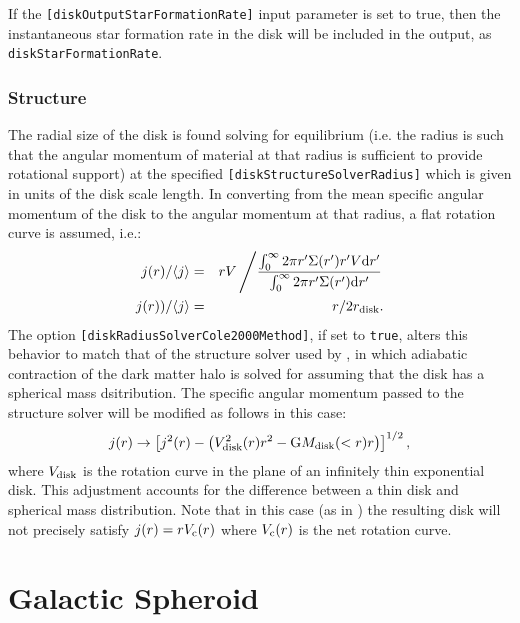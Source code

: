 If the {\tt [diskOutputStarFormationRate]} input parameter is set to true, then the instantaneous star formation rate in the disk will be included in the output, as {\tt diskStarFormationRate}.

\subsubsection{Structure}

The radial size of the disk is found solving for equilibrium (i.e. the radius is such that the angular momentum of material at that radius is sufficient to provide rotational support) at the specified {\tt [diskStructureSolverRadius]} which is given in units of the disk scale length. In converting from the mean specific angular momentum of the disk to the angular momentum at that radius, a flat rotation curve is assumed, i.e.:
\begin{eqnarray}
 j(r)/\langle j \rangle &=& r V \left/ {\int_0^\infty 2 \pi r^\prime \Sigma(r^\prime) r^\prime V {\rm d} r^\prime \over \int_0^\infty 2 \pi r^\prime \Sigma(r^\prime) {\rm d} r^\prime} \right. \nonumber \\
 j(r))/\langle j \rangle &=& r / 2 r_{\rm disk}.
\end{eqnarray}
The option {\tt [diskRadiusSolverCole2000Method]}, if set to {\tt true}, alters this behavior to match that of the structure solver used by \cite{cole_hierarchical_2000}, in which adiabatic contraction of the dark matter halo is solved for assuming that the disk has a spherical mass dsitribution. The specific angular momentum passed to the structure solver will be modified as follows in this case:
\begin{equation}
 j(r) \rightarrow \left[ j^2(r) - \left( V_{\rm disk}^2(r) r^2 - {\rm G} M_{\rm disk}(<r) r \right) \right]^{1/2},
\end{equation}
where $V_{\rm disk}$ is the rotation curve in the plane of an infinitely thin exponential disk. This adjustment accounts for the difference between a thin disk and spherical mass distribution. Note that in this case (as in \citealt{cole_hierarchical_2000}) the resulting disk will not precisely satisfy $j(r) = r V_{\rm c}(r)$ where $V_{\rm c}(r)$ is the net rotation curve.

\section{Galactic Spheroid}\label{sec:ComponentSpheroid}

